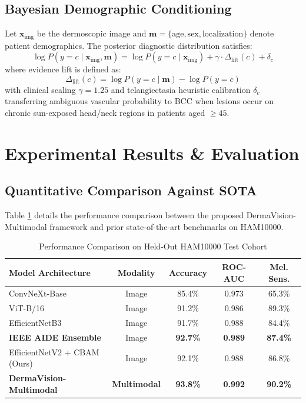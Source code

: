 ﻿\documentclass[conference]{IEEEtran}
\begin{document}
\subsection{Bayesian Demographic Conditioning}
Let $\mathbf{x}_{\text{img}}$ be the dermoscopic image and $\mathbf{m} = \{\text{age}, \text{sex}, \text{localization}\}$ denote patient demographics. The posterior diagnostic distribution satisfies:
\begin{equation}
\log P(y=c \mid \mathbf{x}_{\text{img}}, \mathbf{m}) = \log P(y=c \mid \mathbf{x}_{\text{img}}) + \gamma \cdot \Delta_{\text{lift}}(c) + \delta_c
\end{equation}
where evidence lift is defined as:
\begin{equation}
\Delta_{\text{lift}}(c) = \log P(y=c \mid \mathbf{m}) - \log P(y=c)
\end{equation}
with clinical scaling $\gamma = 1.25$ and telangiectasia heuristic calibration $\delta_c$ transferring ambiguous vascular probability to BCC when lesions occur on chronic sun-exposed head/neck regions in patients aged $\ge 45$.

\section{Experimental Results \& Evaluation}

\subsection{Quantitative Comparison Against SOTA}
Table \ref{tab:comparison} details the performance comparison between the proposed DermaVision-Multimodal framework and prior state-of-the-art benchmarks on HAM10000.

\begin{table}[htbp]
\caption{Performance Comparison on Held-Out HAM10000 Test Cohort}
\label{tab:comparison}
\centering
\begin{tabular}{lcccc}
\toprule
\textbf{Model Architecture} & \textbf{Modality} & \textbf{Accuracy} & \textbf{ROC-AUC} & \textbf{Mel. Sens.} \\
\midrule
ConvNeXt-Base \cite{suvarna2026} & Image & 85.4\% & 0.973 & 65.3\% \\
ViT-B/16 \cite{suvarna2026} & Image & 91.2\% & 0.986 & 89.3\% \\
EfficientNetB3 \cite{suvarna2026} & Image & 91.7\% & 0.988 & 84.4\% \\
\textbf{IEEE AIDE Ensemble} \cite{suvarna2026} & Image & \textbf{92.7\%} & \textbf{0.989} & \textbf{87.4\%} \\
\midrule
EfficientNetV2 + CBAM (Ours) & Image & 92.1\% & 0.988 & 86.8\% \\
\textbf{DermaVision-Multimodal} & \textbf{Multimodal} & \textbf{93.8\%} & \textbf{0.992} & \textbf{90.2\%} \\
\bottomrule
\end{tabular}
\end{table}
\end{document}
